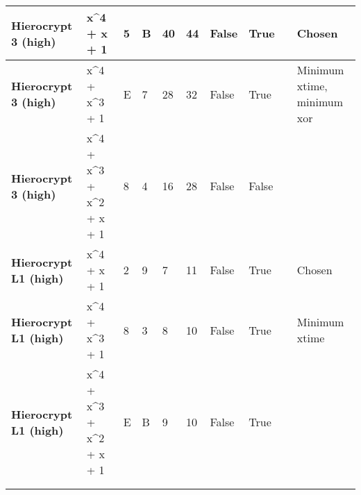 \begin{footnotesize}
\begin{longtable}{|l|l|l|l|l|l|l|l|l|l|}
\textbf{Hierocrypt 3 (high)}  & x\textasciicircum{}4 + x + 1                                               & 5             & B                 & 40                  & 44                    & False               & True              &              & Chosen                     \\ \hline
\textbf{Hierocrypt 3 (high)}  & x\textasciicircum{}4 + x\textasciicircum{}3 + 1                            & E             & 7                 & 28                  & 32                    & False               & True              &              & Minimum xtime, minimum xor \\ \hline
\textbf{Hierocrypt 3 (high)}  & x\textasciicircum{}4 + x\textasciicircum{}3 + x\textasciicircum{}2 + x + 1 & 8             & 4                 & 16                  & 28                    & False               & False             &              &                            \\ \hline
\textbf{Hierocrypt L1 (high)} & x\textasciicircum{}4 + x + 1                                               & 2             & 9                 & 7                   & 11                    & False               & True              &              & Chosen                     \\ \hline
\textbf{Hierocrypt L1 (high)} & x\textasciicircum{}4 + x\textasciicircum{}3 + 1                            & 8             & 3                 & 8                   & 10                    & False               & True              &              & Minimum xtime              \\ \hline
\textbf{Hierocrypt L1 (high)} & x\textasciicircum{}4 + x\textasciicircum{}3 + x\textasciicircum{}2 + x + 1 & E             & B                 & 9                   & 10                    & False               & True              &              &                            \\ \hline
                              &                                                                            &               &                   &                     &                       &                     &                   &              &                            \\ \hline
                              &                                                                            &               &                   &                     &                       &                     &                   &              &                            \\ \hline

\end{longtable}
\end{footnotesize}
